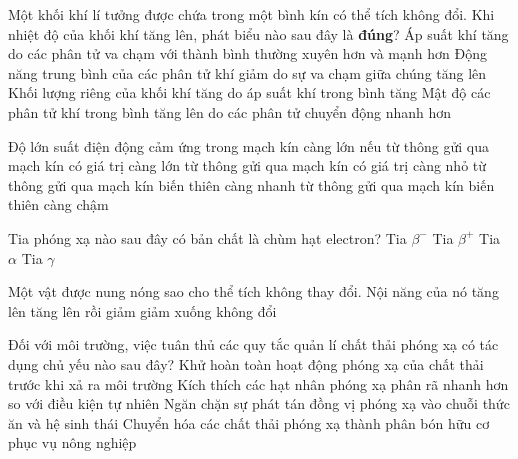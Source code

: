 	\begin{ex}%
		Một khối khí lí tưởng được chứa trong một bình kín có thể tích không đổi. Khi nhiệt độ của khối khí tăng lên, phát biểu nào sau đây là \textbf{đúng}?
		\choice
		{\True Áp suất khí tăng do các phân tử va chạm với thành bình thường xuyên hơn và mạnh hơn}
		{Động năng trung bình của các phân tử khí giảm do sự va chạm giữa chúng tăng lên}
		{Khối lượng riêng của khối khí tăng do áp suất khí trong bình tăng}
		{Mật độ các phân tử khí trong bình tăng lên do các phân tử chuyển động nhanh hơn}
	\end{ex}

	\begin{ex}%
		Độ lớn suất điện động cảm ứng trong mạch kín càng lớn nếu
		\choice
		{từ thông gửi qua mạch kín có giá trị càng lớn}
		{từ thông gửi qua mạch kín có giá trị càng nhỏ}
		{\True từ thông gửi qua mạch kín biến thiên càng nhanh}
		{từ thông gửi qua mạch kín biến thiên càng chậm}
	\end{ex}

	\begin{ex}%
		Tia phóng xạ nào sau đây có bản chất là chùm hạt electron?
		\choice
		{\True Tia $\beta^-$}
		{Tia $\beta^+$}
		{Tia $\alpha$}
		{Tia $\gamma$}
	\end{ex}

	\begin{ex}%
		Một vật được nung nóng sao cho thể tích không thay đổi. Nội năng của nó
		\choice
		{\True tăng lên}
		{tăng lên rồi giảm}
		{giảm xuống}
		{không đổi}
	\end{ex}

	\begin{ex}%
		Đối với môi trường, việc tuân thủ các quy tắc quản lí chất thải phóng xạ có tác dụng chủ yếu nào sau đây?
		\choice
		{Khử hoàn toàn hoạt động phóng xạ của chất thải trước khi xả ra môi trường}
		{Kích thích các hạt nhân phóng xạ phân rã nhanh hơn so với điều kiện tự nhiên}
		{\True Ngăn chặn sự phát tán đồng vị phóng xạ vào chuỗi thức ăn và hệ sinh thái}
		{Chuyển hóa các chất thải phóng xạ thành phân bón hữu cơ phục vụ nông nghiệp}
	\end{ex}


